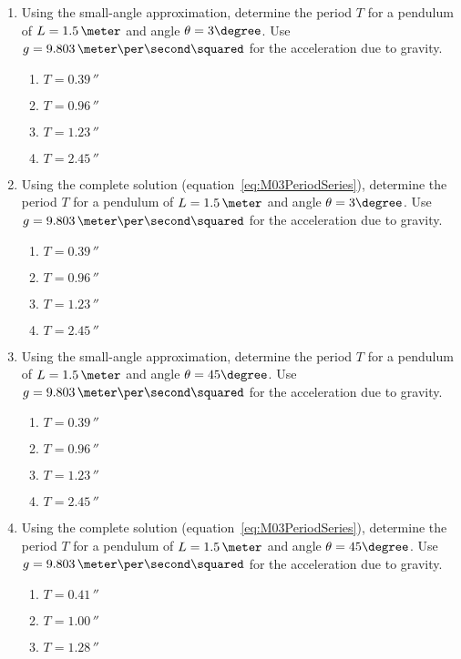 \begin{enumerate}
\item Using the small-angle approximation, determine the period $T$ for a pendulum of $L = 1.5\,\meter$ and angle $\theta = 3\degree$. Use $g = 9.803\,\meter\per\second\squared$ for the acceleration due to gravity.
  \begin{enumerate}
  \item $T = 0.39\,\second$
  \item $T = 0.96\,\second$
  \item $T = 1.23\,\second$
  \item $T = 2.45\,\second$
  \end{enumerate}
\item Using the complete solution (equation~\ref{eq:M03PeriodSeries}), determine the period $T$ for a pendulum of $L = 1.5\,\meter$ and angle $\theta = 3\degree$. Use $g = 9.803\,\meter\per\second\squared$ for the acceleration due to gravity.
  \begin{enumerate}
  \item $T =  0.39\,\second$
  \item $T =  0.96\,\second$
  \item $T =  1.23\,\second$
  \item $T =  2.45\,\second$
  \end{enumerate}
\item Using the small-angle approximation, determine the period $T$ for a pendulum of $L = 1.5\,\meter$ and angle $\theta = 45\degree$. Use $g = 9.803\,\meter\per\second\squared$ for the acceleration due to gravity.
  \begin{enumerate}
  \item $T =  0.39\,\second$
  \item $T =  0.96\,\second$
  \item $T =  1.23\,\second$
  \item $T =  2.45\,\second$
  \end{enumerate}
\item Using the complete solution (equation~\ref{eq:M03PeriodSeries}), determine the period $T$ for a pendulum of $L = 1.5\,\meter$ and angle $\theta = 45\degree$. Use $g = 9.803\,\meter\per\second\squared$ for the acceleration due to gravity.
  \begin{enumerate}
  \item $T =  0.41\,\second$
  \item $T =  1.00\,\second$
  \item $T =  1.28\,\second$

\end{enumerate}
\end{enumerate}
